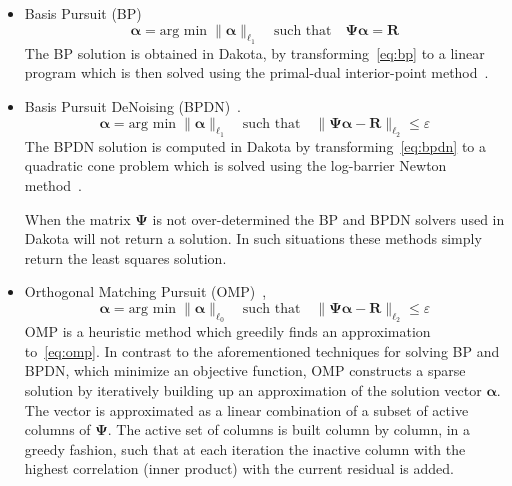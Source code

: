 \begin{itemize}
 \item Basis Pursuit (BP)~\cite{Chen2001}
\begin{equation}
\label{eq:bp}
\boldsymbol{\alpha} = \text{arg min} \; \|\boldsymbol{\alpha}\|_{\ell_1}\quad \text{such that}\quad \boldsymbol{\Psi}\boldsymbol{\alpha} = \boldsymbol{R}
\end{equation}
The BP solution is obtained in Dakota, by transforming~\eqref{eq:bp} to a 
linear program which is then solved using the primal-dual
interior-point method~\cite{Boyd2004,Chen2001}.
\item Basis Pursuit DeNoising (BPDN)~\cite{Chen2001}. 
\begin{equation}
\label{eq:bpdn}
\boldsymbol{\alpha} = \text{arg min}\; \|\boldsymbol{\alpha}\|_{\ell_1}\quad \text{such that}\quad \|\boldsymbol{\Psi}\boldsymbol{\alpha} - \boldsymbol{R}\|_{\ell_2} \le \varepsilon
\end{equation}
The BPDN solution is computed in Dakota by transforming~\eqref{eq:bpdn} 
to a quadratic cone problem which is solved using the log-barrier Newton 
method~\cite{Boyd2004,Chen2001}. 


When the matrix $\boldsymbol{\Psi}$ is not over-determined the BP and BPDN solvers used in Dakota
will not return a solution. In such situations these methods simply return the least squares solution.
\item Orthogonal Matching Pursuit (OMP)~\cite{Davis1997},
\begin{equation}
\label{eq:omp}
\boldsymbol{\alpha} = \text{arg min}\; \|\boldsymbol{\alpha}\|_{\ell_0}\quad \text{such that}\quad \|\boldsymbol{\Psi}\boldsymbol{\alpha} - \boldsymbol{R}\|_{\ell_2} \le \varepsilon
\end{equation}
OMP is a heuristic method which greedily finds an approximation to~\eqref{eq:omp}. In contrast to the aforementioned techniques for solving BP and BPDN, 
which minimize an objective function, OMP constructs a sparse solution by iteratively 
building up an approximation of the solution vector $\boldsymbol{\alpha}$. 
The vector is approximated as a linear combination of a subset of active columns of 
$\boldsymbol{\Psi}$. The active set of columns is built column by column, in
a greedy fashion, such that at each iteration the inactive column with the highest correlation
(inner product) with the current residual is added.


\end{itemize}
